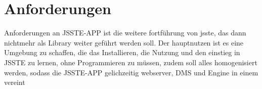 \section{Anforderungen}
Anforderungen an JSSTE-APP ist die weitere fortführung von jsste, das dann nichtmehr als Library weiter geführt werden soll.
Der hauptnutzen ist es eine Umgebung zu schaffen, die das Installieren, die Nutzung und den einstieg in JSSTE zu lernen, ohne Programmieren zu müssen, zudem soll alles homogenisiert werden, sodass die JSSTE-APP gelichzeitig webserver, DMS und Engine in einem vereint